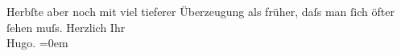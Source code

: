 \begin{ledgroupsized}[t]{13cm}
                    Herbſte aber noch mit viel tieferer Überzeugung als früher, daſs man ſich öfter
                    ſehen muſs.\pend
           \pstart
           Herzlich Ihr{\\[\baselineskip]}\spacefill\mbox{Hugo.}\pend
           \leftskip=0em{}\endnumbering{}\end{ledgroupsized}  \newcommand{\dateiname}{L00849}\newcommand{\titel}{Hugo von Hofmannsthal an Arthur Schnitzler, 2. 10. [1898]}\newcommand{\editorInnen}{Martin Anton Müller und Gerd-Hermann Susen}
      
